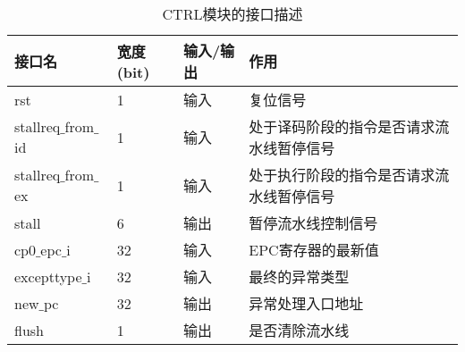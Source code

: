 \quad
\begin{table}[H]
	\centering
	\caption{CTRL模块的接口描述}
	\begin{tabular}{|l|l|l|l|}
		\hline
		接口名 & 宽度(bit) & 输入/输出 & 作用 \\
		\hline
		rst & 1 & 输入 & 复位信号 \\
		\hline
		stallreq$\_$from$\_$id & 1 & 输入 & 处于译码阶段的指令是否请求流水线暂停信号 \\
		\hline
		stallreq$\_$from$\_$ex & 1 & 输入 & 处于执行阶段的指令是否请求流水线暂停信号 \\
		\hline
		stall & 6 & 输出 & 暂停流水线控制信号 \\
		\hline
		cp0$\_$epc$\_$i & 32 & 输入 & EPC寄存器的最新值 \\
		\hline
		excepttype$\_$i & 32 & 输入 & 最终的异常类型 \\
		\hline
		new$\_$pc & 32 & 输出 & 异常处理入口地址 \\
		\hline
		flush & 1 & 输出 & 是否清除流水线 \\
		\hline
	\end{tabular}
\end{table}
